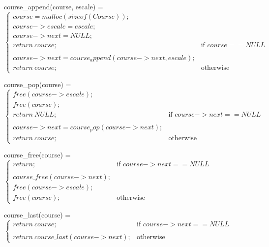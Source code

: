 course\_append(course, escale) = $
                \begin{cases}
                    course = malloc(sizeof(Course)); \\
                    course->escale = escale; \\
                    course->next = NULL; \\
                    return\ course; & \text{if } course == NULL \\
                    \\
                    course->next = course_append(course->next, escale);\\
                    return\ course; & \text{otherwise}
                \end{cases} $

course\_pop(course) = $
                \begin{cases}
                    free(course->escale); \\
                    free(course); \\
                    return\ NULL; & \text{if } course->next == NULL \\
                    \\
                    course->next = course_pop(course->next);\\
                    return\ course; & \text{otherwise}
                \end{cases} $

course\_free(course) = $
                \begin{cases}
                    return; & \text{if } course->next == NULL \\
                    \\
                    course\_free(course->next); \\
                    free(course->escale); \\
                    free(course); & \text{otherwise}
                \end{cases} $

course\_last(course) = $
                \begin{cases}
                    return\ course; & \text{if } course->next == NULL \\
                    \\
                    return\ course\_last(course->next); & \text{otherwise}
                \end{cases} $
